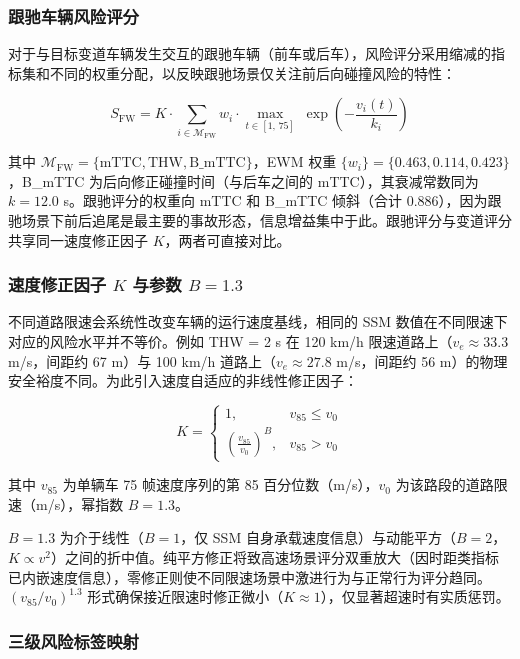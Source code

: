 \documentclass[preprint,review,12pt,a4paper]{elsarticle}
\begin{document}
\subsubsection{跟驰车辆风险评分}

对于与目标变道车辆发生交互的跟驰车辆（前车或后车），风险评分采用缩减的指标集和不同的权重分配，以反映跟驰场景仅关注前后向碰撞风险的特性：

\begin{equation}
S_{\text{FW}} = K \cdot \sum_{i \in \mathcal{M}_{\text{FW}}} w_i \cdot \max_{t \in [1,\,75]}\;\exp\!\left(-\frac{v_i(t)}{k_i}\right)
\end{equation}

其中 $\mathcal{M}_{\text{FW}} = \{\text{mTTC}, \text{THW}, \text{B\_mTTC}\}$，EWM 权重 $\{w_i\} = \{0.463, 0.114, 0.423\}$，B\_mTTC 为后向修正碰撞时间（与后车之间的 mTTC），其衰减常数同为 $k = 12.0$ s。跟驰评分的权重向 mTTC 和 B\_mTTC 倾斜（合计 0.886），因为跟驰场景下前后追尾是最主要的事故形态，信息增益集中于此。跟驰评分与变道评分共享同一速度修正因子 $K$，两者可直接对比。

\subsubsection{速度修正因子 $K$ 与参数 $B=1.3$}

不同道路限速会系统性改变车辆的运行速度基线，相同的 SSM 数值在不同限速下对应的风险水平并不等价。例如 THW = 2 s 在 120 km/h 限速道路上（$v_e \approx 33.3$ m/s，间距约 67 m）与 100 km/h 道路上（$v_e \approx 27.8$ m/s，间距约 56 m）的物理安全裕度不同。为此引入速度自适应的非线性修正因子：

\begin{equation}
K = \begin{cases}
1, & v_{85} \leq v_0 \\[4pt]
\displaystyle\left(\frac{v_{85}}{v_0}\right)^{B}, & v_{85} > v_0
\end{cases}
\end{equation}

其中 $v_{85}$ 为单辆车 75 帧速度序列的第 85 百分位数（m/s），$v_0$ 为该路段的道路限速（m/s），幂指数 $B = 1.3$。

$B=1.3$ 为介于线性（$B=1$，仅 SSM 自身承载速度信息）与动能平方（$B=2$，$K\propto v^2$）之间的折中值。纯平方修正将致高速场景评分双重放大（因时距类指标已内嵌速度信息），零修正则使不同限速场景中激进行为与正常行为评分趋同。$(v_{85}/v_0)^{1.3}$ 形式确保接近限速时修正微小（$K\approx1$），仅显著超速时有实质惩罚。

\subsubsection{三级风险标签映射}
\end{document}
